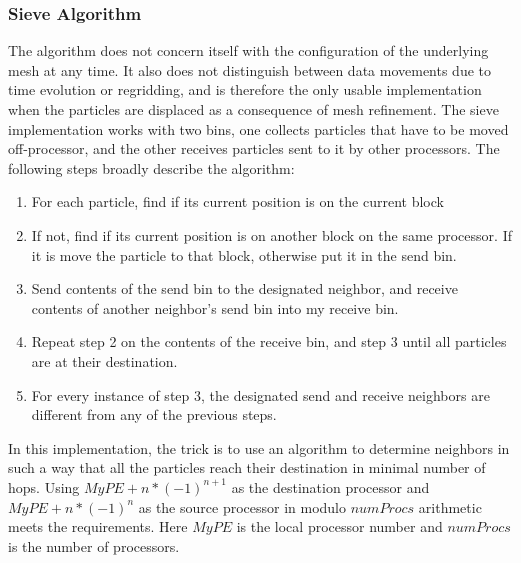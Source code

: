 \subsubsection{Sieve Algorithm}
\label {Sec: sieve_algorithm}
The  algorithm does not concern itself with the
configuration of the underlying mesh at any time. It 
also does not distinguish between data movements due to time evolution
or regridding, and is therefore the only usable implementation when
the particles are displaced as a consequence of mesh refinement. 
The sieve implementation works with two bins, one
collects particles that have to be moved off-processor, and the other
receives particles sent to it by other processors. The following steps
broadly describe the algorithm: 
\begin{enumerate}
\item For each particle, find if its current position is on the current block
\item If not, find if its current position is on another block on the
same processor. If it is move the particle to that block, otherwise
put it in the send bin.
\item Send contents of the send bin to the designated neighbor, and
receive contents of another neighbor's send bin into my receive bin.
\item Repeat step 2 on the contents of the receive bin, and step 3
until all particles are at their destination.
\item For every instance of step 3, the designated send and receive
neighbors are different from any of the previous steps.
\end{enumerate}
In this implementation, the trick is to use an algorithm to determine
neighbors in such a way that all the particles reach their destination
in minimal number of hops. Using $MyPE+n*(-1)^{n+1}$ as the
destination processor and $MyPE+n*(-1)^{n}$ as the source processor in
modulo $numProcs$ arithmetic meets the requirements. Here $MyPE$ is
the local processor number and $numProcs$ is the number of processors.

